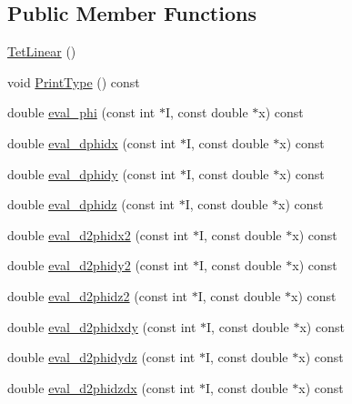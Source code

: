 \subsection*{Public Member Functions}
\begin{DoxyCompactItemize}
\item 
\mbox{\hyperlink{classfemus_1_1_tet_linear_a32c02566d405cf5fbf1b9aa5430b3181}{Tet\+Linear}} ()
\item 
void \mbox{\hyperlink{classfemus_1_1_tet_linear_a3c42a3845b94a0b0d0fd654f6cbee9d2}{Print\+Type}} () const
\item 
double \mbox{\hyperlink{classfemus_1_1_tet_linear_a99764a6a2e65bc163dc17c864db6c55d}{eval\+\_\+phi}} (const int $\ast$I, const double $\ast$x) const
\item 
double \mbox{\hyperlink{classfemus_1_1_tet_linear_ac073a70b60d884941d44656b9fc4b226}{eval\+\_\+dphidx}} (const int $\ast$I, const double $\ast$x) const
\item 
double \mbox{\hyperlink{classfemus_1_1_tet_linear_a2e636fe3c775bd207e2240588c8185c7}{eval\+\_\+dphidy}} (const int $\ast$I, const double $\ast$x) const
\item 
double \mbox{\hyperlink{classfemus_1_1_tet_linear_ae399d6e283b007349b0170579954e3fc}{eval\+\_\+dphidz}} (const int $\ast$I, const double $\ast$x) const
\item 
double \mbox{\hyperlink{classfemus_1_1_tet_linear_a7fea6490e2ca09cbd97ce31e4bb9ddef}{eval\+\_\+d2phidx2}} (const int $\ast$I, const double $\ast$x) const
\item 
double \mbox{\hyperlink{classfemus_1_1_tet_linear_a7899d462e924de10cb39e0953fe0b68a}{eval\+\_\+d2phidy2}} (const int $\ast$I, const double $\ast$x) const
\item 
double \mbox{\hyperlink{classfemus_1_1_tet_linear_adc5774a2ba2c00070315ecad91395f51}{eval\+\_\+d2phidz2}} (const int $\ast$I, const double $\ast$x) const
\item 
double \mbox{\hyperlink{classfemus_1_1_tet_linear_a45330406ce8b3f4ad0651e7ffda5dd82}{eval\+\_\+d2phidxdy}} (const int $\ast$I, const double $\ast$x) const
\item 
double \mbox{\hyperlink{classfemus_1_1_tet_linear_a70ae26a7051a2bf183d18e21c2d59822}{eval\+\_\+d2phidydz}} (const int $\ast$I, const double $\ast$x) const
\item 
double \mbox{\hyperlink{classfemus_1_1_tet_linear_ad4fe543f5c2bd7fe70d3f8b0d11ddac7}{eval\+\_\+d2phidzdx}} (const int $\ast$I, const double $\ast$x) const
\end{DoxyCompactItemize}
